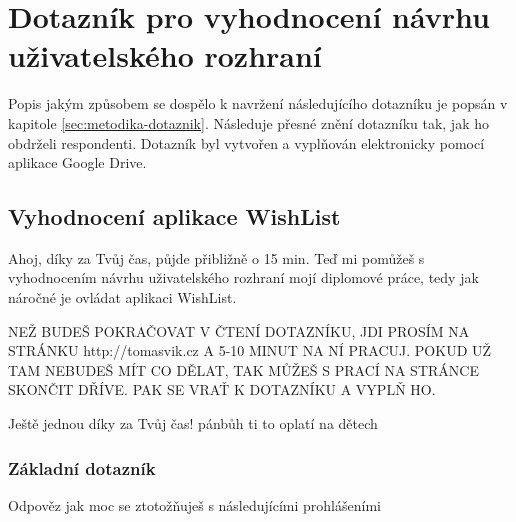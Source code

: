 \chapter{Dotazník pro vyhodnocení návrhu uživatelského rozhraní}
Popis jakým způsobem se dospělo k navržení následujícího dotazníku je popsán v kapitole \ref{sec:metodika-dotaznik}. Následuje přesné znění dotazníku tak, jak ho obdrželi respondenti. Dotazník byl vytvořen a vyplňován elektronicky pomocí aplikace Google Drive.

\section{Vyhodnocení aplikace WishList}
Ahoj, díky za Tvůj čas, půjde přibližně o 15 min. Teď mi pomůžeš s vyhodnocením návrhu uživatelského rozhraní mojí diplomové práce, tedy jak náročné je ovládat aplikaci WishList. 

NEŽ BUDEŠ POKRAČOVAT V ČTENÍ DOTAZNÍKU, JDI PROSÍM NA STRÁNKU http://tomasvik.cz A 5-10 MINUT NA NÍ PRACUJ. POKUD UŽ TAM NEBUDEŠ MÍT CO DĚLAT, TAK MŮŽEŠ S PRACÍ NA STRÁNCE SKONČIT DŘÍVE. PAK SE VRAŤ K DOTAZNÍKU A VYPLŇ HO.

Ještě jednou díky za Tvůj čas! pánbůh ti to oplatí na dětech

\subsection{Základní dotazník}
Odpověz jak moc se ztotožňuješ s následujícími prohlášeními

